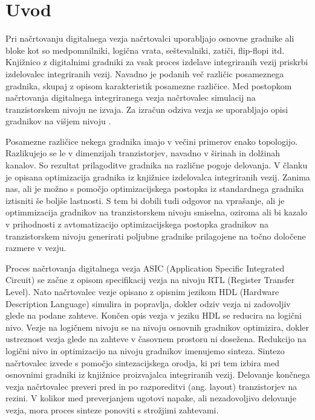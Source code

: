 \documentclass[journal,a4paper,twoside]{template/IEEEtran}
\begin{document}
\section{Uvod}

Pri načrtovanju digitalnega vezja načrtovalci uporabljajo osnovne gradnike ali bloke \cite{kaeslin} kot so medpomnilniki, logična vrata, seštevalniki, zatiči, flip-flopi itd. Knjižnico z digitalnimi gradniki za vsak proces izdelave integriranih vezij priskrbi izdelovalec integriranih vezij. Navadno je podanih več različic posameznega gradnika, skupaj z opisom karakteristik posamezne različice. Med postopkom načrtovanja digitalnega integriranega vezja načrtovalec simulacij \cite{hspice, kunderth, virtuoso, tuma} na tranzistorskem nivoju ne izvaja. Za izračun odziva vezja se uporabljajo opisi gradnikov na višjem nivoju \cite{thomas, pedroni}.

Posamezne različice nekega gradnika imajo v večini primerov enako topologijo. Razlikujejo se le v dimenzijah tranzistorjev, navadno v širinah in dolžinah kanalov. So rezultat prilagoditve gradnika na različne pogoje delovanja. V članku je opisana optimizacija gradnika iz knjižnice izdelovalca integriranih vezij. Zanima nas, ali je možno s pomočjo optimizacijskega postopka iz standardnega gradnika iztisniti še boljše lastnosti. S tem bi dobili tudi odgovor na vprašanje, ali je optimmizacija gradnikov na tranzistorskem nivoju smiselna, oziroma ali bi kazalo v prihodnosti z avtomatizacijo optimizacijskega postopka gradnikov na tranzistorskem nivoju generirati poljubne gradnike prilagojene na točno določene razmere v vezju.

Proces načrtovanja digitalnega vezja ASIC (Application Specific Integrated Circuit) se začne z opisom specifikacij vezja na nivoju RTL (Register Transfer Level). Nato načrtovalec vezje opisano z opisnim jezikom HDL (Hardware Description Language) simulira in popravlja, dokler odziv vezja ni zadovoljiv glede na podane zahteve. Končen opis vezja v jeziku HDL se reducira na logični nivo. Vezje na logičnem nivoju se na nivoju osnovnih gradnikov optimizira, dokler ustreznost vezja glede na zahteve v časovnem prostoru ni dosežena. Redukcijo na logični nivo in optimizacijo na nivoju gradnikov imenujemo sinteza. Sintezo načrtovalec izvede s pomočjo sintezacijskega orodja, ki pri tem izbira med osnovnimi gradniki iz knjižnice proizvajalca integriranih vezij. Delovanje končnega vezja načrtovalec preveri pred in po razporeditvi (ang. layout) tranzistorjev na rezini. V kolikor med preverjanjem ugotovi napake, ali nezadovoljivo delovanje vezja, mora proces sinteze ponoviti s strožjimi zahtevami.
\end{document}
